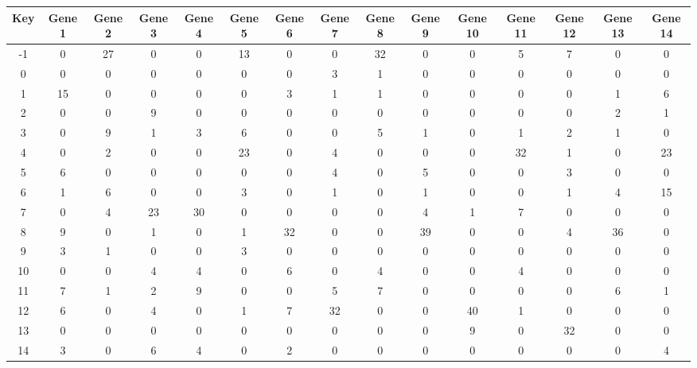 \begin{tabular}{|c|c|c|c|c|c|c|c|c|c|c|c|c|c|c|}
\hline
Key & Gene 1 & Gene 2 & Gene 3 & Gene 4 & Gene 5 & Gene 6 & Gene 7 & Gene 8 & Gene 9 & Gene 10 & Gene 11 & Gene 12 & Gene 13 & Gene 14 \\
\hline
-1 & 0 & 27 & 0 & 0 & 13 & 0 & 0 & 32 & 0 & 0 & 5 & 7 & 0 & 0 \\
0 & 0 & 0 & 0 & 0 & 0 & 0 & 3 & 1 & 0 & 0 & 0 & 0 & 0 & 0 \\
1 & 15 & 0 & 0 & 0 & 0 & 3 & 1 & 1 & 0 & 0 & 0 & 0 & 1 & 6 \\
2 & 0 & 0 & 9 & 0 & 0 & 0 & 0 & 0 & 0 & 0 & 0 & 0 & 2 & 1 \\
3 & 0 & 9 & 1 & 3 & 6 & 0 & 0 & 5 & 1 & 0 & 1 & 2 & 1 & 0 \\
4 & 0 & 2 & 0 & 0 & 23 & 0 & 4 & 0 & 0 & 0 & 32 & 1 & 0 & 23 \\
5 & 6 & 0 & 0 & 0 & 0 & 0 & 4 & 0 & 5 & 0 & 0 & 3 & 0 & 0 \\
6 & 1 & 6 & 0 & 0 & 3 & 0 & 1 & 0 & 1 & 0 & 0 & 1 & 4 & 15 \\
7 & 0 & 4 & 23 & 30 & 0 & 0 & 0 & 0 & 4 & 1 & 7 & 0 & 0 & 0 \\
8 & 9 & 0 & 1 & 0 & 1 & 32 & 0 & 0 & 39 & 0 & 0 & 4 & 36 & 0 \\
9 & 3 & 1 & 0 & 0 & 3 & 0 & 0 & 0 & 0 & 0 & 0 & 0 & 0 & 0 \\
10 & 0 & 0 & 4 & 4 & 0 & 6 & 0 & 4 & 0 & 0 & 4 & 0 & 0 & 0 \\
11 & 7 & 1 & 2 & 9 & 0 & 0 & 5 & 7 & 0 & 0 & 0 & 0 & 6 & 1 \\
12 & 6 & 0 & 4 & 0 & 1 & 7 & 32 & 0 & 0 & 40 & 1 & 0 & 0 & 0 \\
13 & 0 & 0 & 0 & 0 & 0 & 0 & 0 & 0 & 0 & 9 & 0 & 32 & 0 & 0 \\
14 & 3 & 0 & 6 & 4 & 0 & 2 & 0 & 0 & 0 & 0 & 0 & 0 & 0 & 4 \\
\hline
\end{tabular}